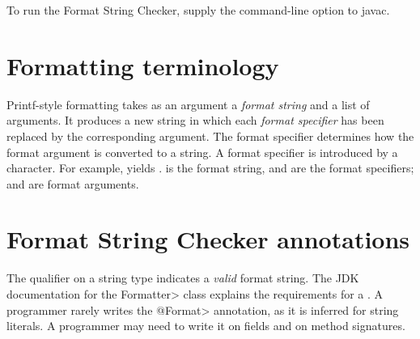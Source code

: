 \begin{sloppypar}
To run the Format String Checker, supply the
 command-line option to javac.
\end{sloppypar}


\section{Formatting terminology\label{formatter-terminology}}

Printf-style formatting takes as an argument a \emph{format string} and a
list of arguments.  It produces a new string in which each \emph{format
  specifier} has been replaced by the corresponding argument.
The format specifier determines how the format argument is converted to a
string.
A format specifier is introduced by a \code{\%} character. For example,
 yields
.   is
the format string,  and  are the format specifiers;
 and  are format arguments.


\section{Format String Checker annotations\label{formatter-annotations}}

The  qualifier on a string type
indicates a \emph{valid} format string.  The JDK documentation for the
\<Formatter> class explains the requirements for a
.
A programmer rarely writes the \<@Format> annotation, as it is inferred for
string literals.  A programmer may need to write it on fields and on method
signatures.


